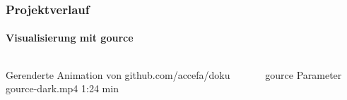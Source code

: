 \begin{frame}
	\frametitle{Projektverlauf\hfill{}\footnotesize \group}
	\framesubtitle{Visualisierung mit gource}
	\begin{columns}
		\begin{column}{0.5\textwidth}
			\begin{block}{Gerenderte Animation von github.com/accefa/doku}
				\\ gource-dark.mp4 \hfill{} 1:24 min
			\end{block}
		\end{column}
		\begin{column}{0.5\textwidth}
			\begin{exampleblock}{gource Parameter}
				
			\end{exampleblock}
		\end{column}
	\end{columns}
\end{frame}
